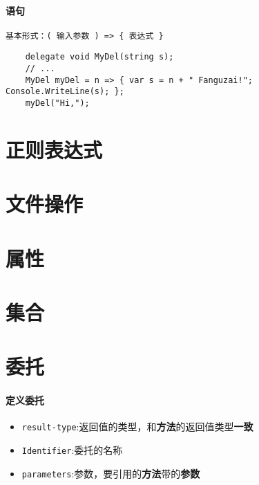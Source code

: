 \documentclass[UTF8,a4paper,12pt]{ctexbook}
\begin{document}
		\paragraph{语句}
			\verb|基本形式：( 输入参数 ) => { 表达式 }|
			\begin{lstlisting}
	delegate void MyDel(string s);  
	// ...
	MyDel myDel = n => { var s = n + " Fanguzai!"; Console.WriteLine(s); };  
	myDel("Hi,");  
			\end{lstlisting}
		
		\paragraph{}	
			
	\section{正则表达式}
	
	\section{文件操作}
	
	\section{属性}
	
	\section{集合}

	\newpage
 	\section{委托}
 		\paragraph{定义委托} 
 			\begin{itemize}
 				\item \verb|result-type|:返回值的类型，和\textbf{方法}的返回值类型\textbf{一致}
 				\item \verb|Identifier|:委托的名称
 				\item \verb|parameters|:参数，要引用的\textbf{方法}带的\textbf{参数}
 			\end{itemize}
 			
		 
\end{document}
